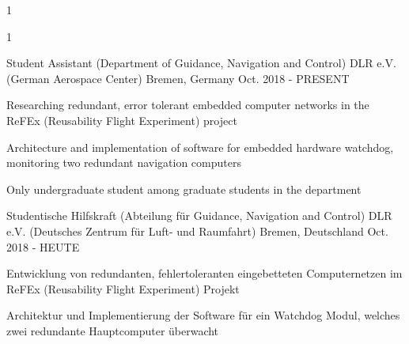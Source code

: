 \multilang
  {1}
  {}
  {}


\begin{cventries}

\multilang
  {1}
  {\cventry
    {Student Assistant (Department of Guidance, Navigation and Control)} %
    {DLR e.V. (German Aerospace Center)} %
    {Bremen, Germany} %
    {Oct. 2018 - PRESENT} %
    {
      \begin{cvitems} %
        \item {Researching redundant, error tolerant embedded computer networks in the ReFEx (Reusability Flight Experiment) project}
        \item {Architecture and implementation of software for embedded hardware watchdog, monitoring two redundant navigation computers}
        \item {Only undergraduate student among graduate students in the department}
      \end{cvitems}
    }
  }{\cventry
    {Studentische Hilfskraft (Abteilung für Guidance, Navigation and Control)} %
    {DLR e.V. (Deutsches Zentrum für Luft- und Raumfahrt)} %
    {Bremen, Deutschland} %
    {Oct. 2018 - HEUTE} %
    {
      \begin{cvitems} %
        \item {Entwicklung von redundanten, fehlertoleranten eingebetteten Computernetzen im ReFEx (Reusability Flight Experiment) Projekt}
        \item {Architektur und Implementierung der Software für ein Watchdog Modul, welches zwei redundante Hauptcomputer überwacht}
      \end{cvitems}
    }
  }
    

\end{cventries}
